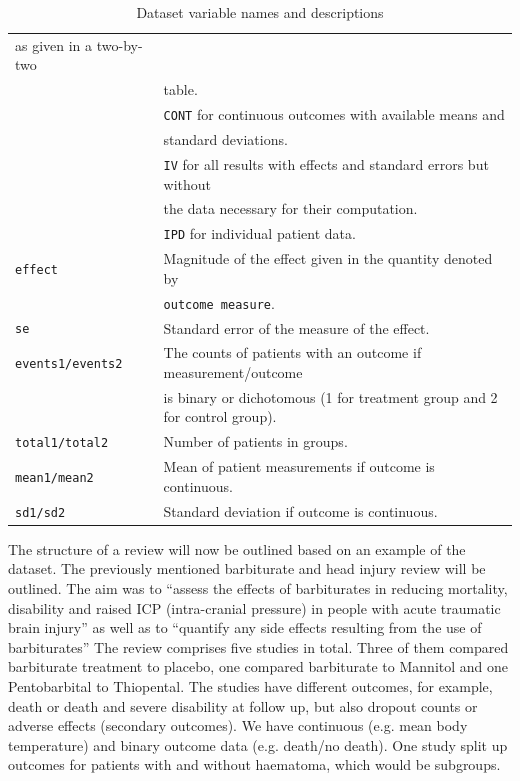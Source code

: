 \documentclass[11pt,a4paper,twoside]{book}\usepackage[]{graphicx}\usepackage[]{color}
\begin{document}
\begin{table}[ht]
\begin{center}
\begin{tabular}{ll}
      as given in a two-by-two \\ &table. \\ &\texttt{CONT} for continuous outcomes with available means and \\ &standard deviations. \\ & \texttt{IV} for all results with effects and standard errors but without \\ & the data necessary for their computation. \\ &\texttt{IPD} for individual patient data.\\
      \texttt{effect} & Magnitude of the effect given in the quantity denoted by \\ &\texttt{outcome measure}.\\
      \texttt{se} & Standard error of the measure of the effect.\\
      \texttt{events1/events2} & The counts of patients with an outcome if measurement/outcome \\ &is binary or dichotomous (1 for treatment group and 2 for control group).\\
      \texttt{total1/total2} & Number of patients in groups.\\
      \texttt{mean1/mean2} & Mean of patient measurements if outcome is continuous.\\
      \texttt{sd1/sd2} & Standard deviation if outcome is continuous.
    \end{tabular}
  \caption{Dataset variable names and descriptions  \label{variable}}
  \label{variable}
  \end{center}
\end{table}

\vspace{0mm}
The structure of a review will now be outlined based on an example of the dataset. The previously mentioned barbiturate and head injury review will be outlined. The aim was to ``assess the effects of barbiturates in reducing mortality, disability and raised ICP (intra-cranial pressure) in people with acute traumatic brain injury'' as well as to ``quantify any side effects resulting from the use of barbiturates'' %
The review comprises five studies in total. Three of them compared barbiturate treatment to placebo, one compared barbiturate to Mannitol and one Pentobarbital to Thiopental. The studies have different outcomes, for example, death or death and severe disability at follow up, but also dropout counts or adverse effects (secondary outcomes).
We have continuous (e.g. mean body temperature) and binary outcome data (e.g. death/no death). One study split up outcomes for patients with and without haematoma, which would be subgroups. %
\end{document}
